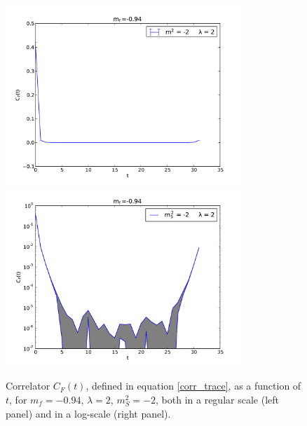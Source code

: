 \begin{figure}[thb] 
\begin{adjustwidth}{-4em}{-4em}
  \includegraphics[width=9cm,clip]{pics/spectrum_trace}\includegraphics[width=9cm,clip]{pics/spectrum_trace_log}
\end{adjustwidth}
  \caption{Correlator $C_F(t)$, defined in equation \ref{corr_trace}, as a function of $t$, for $m_f = -0.94$, $\lambda = 2$, $m_S^2 = -2$, both in a regular scale (left panel) and in a log-scale (right panel).}
  \label{spectrum_trace}
\end{figure}


